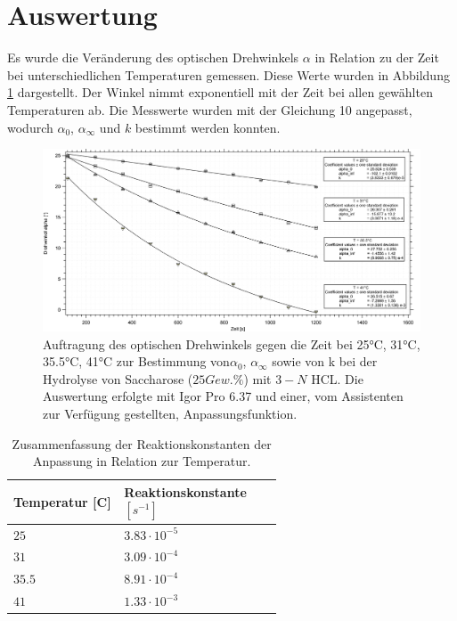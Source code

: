%
%

\section{Auswertung}

Es wurde die Veränderung des optischen Drehwinkels $\alpha$ in Relation zu der Zeit bei unterschiedlichen Temperaturen gemessen. Diese Werte wurden in Abbildung \ref{at} dargestellt. Der Winkel nimmt exponentiell mit der Zeit bei allen gewählten Temperaturen ab. Die Messwerte wurden mit der Gleichung 10 angepasst, wodurch $\alpha_0$, $\alpha_\infty$ und $k$ bestimmt werden konnten.


\begin{figure}[h]
	\centering	
	\begin{minipage}{1\textwidth}
	\includegraphics[width=\columnwidth]{Bilder/Graph1.png}
	\end{minipage}
		\caption{Auftragung des optischen Drehwinkels gegen die Zeit bei 25°C, 31°C, 35.5°C, 41°C zur Bestimmung von$\alpha_0$, $\alpha_\infty$ sowie von k bei der Hydrolyse von Saccharose ($25 Gew.\%$) mit $3-N$ HCL. Die Auswertung erfolgte mit Igor Pro 6.37 und einer, vom Assistenten zur Verfügung gestellten, Anpassungsfunktion.}
	\label{at}
\end{figure}

\begin{table}[H]
\centering

 
 
 \caption{Zusammenfassung der Reaktionskonstanten der Anpassung  in Relation zur Temperatur.}
\begin{tabular}{L{0.3\linewidth}L{0.3\linewidth}}
Temperatur [\text{\textdegree}C] & Reaktionskonstante $[\si{s}^{-1}]$ \\
\hline \addlinespace[1ex] 
$25$ & $3.83\cdot 10^{-5}$ \\
$31$ & $3.09\cdot 10^{-4}$ \\
$35.5$ & $8.91\cdot 10^{-4}$ \\
$41$ & $1.33\cdot 10^{-3}$ \\
 \end{tabular}
 \label{tab1}
 \end{table}

